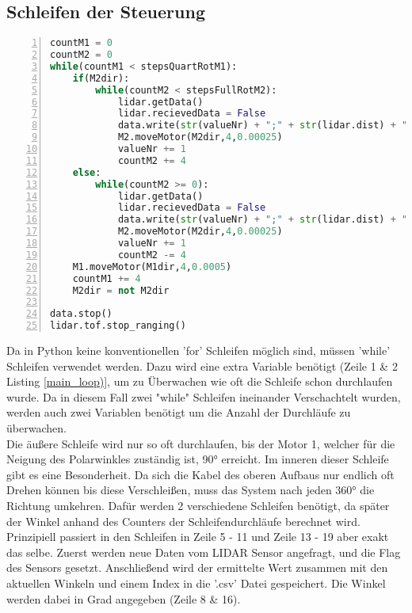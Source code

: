 \subsection{Schleifen der Steuerung}
\begin{lstlisting}[caption={Messen und Aufzeichnen der Entfernungen}, language={Python}, label={main_loop}, numbers=left]
countM1 = 0
countM2 = 0
while(countM1 < stepsQuartRotM1):
    if(M2dir):
        while(countM2 < stepsFullRotM2):
            lidar.getData()
            lidar.recievedData = False
            data.write(str(valueNr) + ";" + str(lidar.dist) + ";" + str(360.0*countM2/stepsFullRotM2) + ";" + str(90.0*countM1/stepsQuartRotM1) + "\n")
            M2.moveMotor(M2dir,4,0.00025)
            valueNr += 1
            countM2 += 4
    else:
        while(countM2 >= 0):
            lidar.getData()
            lidar.recievedData = False
            data.write(str(valueNr) + ";" + str(lidar.dist) + ";" + str(360.0*countM2/stepsFullRotM2) + ";" + str(90.0*countM1/stepsQuartRotM1) + "\n")
            M2.moveMotor(M2dir,4,0.00025)
            valueNr += 1
            countM2 -= 4
    M1.moveMotor(M1dir,4,0.0005)
    countM1 += 4
    M2dir = not M2dir

data.stop()
lidar.tof.stop_ranging()
\end{lstlisting}
Da in Python keine konventionellen 'for' Schleifen möglich sind, müssen 'while' Schleifen verwendet werden. Dazu wird eine extra Variable benötigt (Zeile 1 \& 2 Listing \ref{main_loop)}, um zu Überwachen wie oft die Schleife schon durchlaufen wurde. Da in diesem Fall zwei "while" Schleifen ineinander Verschachtelt wurden, werden auch zwei Variablen benötigt um die Anzahl der Durchläufe zu überwachen. \\
Die äußere Schleife wird nur so oft durchlaufen, bis der Motor 1, welcher für die Neigung des Polarwinkles zuständig ist, 90° erreicht. Im inneren dieser Schleife gibt es eine Besonderheit. Da sich die Kabel des oberen Aufbaus nur endlich oft Drehen können bis diese Verschleißen, muss das System nach jeden 360° die Richtung umkehren. Dafür werden 2 verschiedene Schleifen benötigt, da später der Winkel anhand des Counters der Schleifendurchläufe berechnet wird. Prinzipiell passiert in den Schleifen in Zeile 5 - 11 und Zeile 13 - 19 aber exakt das selbe. Zuerst werden neue Daten vom \ac{LIDAR} Sensor angefragt, und die Flag des Sensors gesetzt. Anschließend wird der ermittelte Wert zusammen mit den aktuellen Winkeln und einem Index in die '.csv' Datei gespeichert. Die Winkel werden dabei in Grad angegeben (Zeile 8 \& 16).\\
